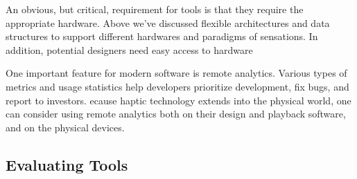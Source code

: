 An obvious, but critical, requirement for \haxd tools is that they require the appropriate hardware.
Above we've discussed flexible architectures and data structures to support different hardwares and paradigms of sensations.
In addition, potential designers need easy access to hardware


One important feature for modern software is remote analytics.
Various types of metrics and usage statistics help developers prioritize development, fix bugs, and report to investors.
ecause haptic technology extends into the physical world, one can consider using remote analytics both on their design and playback software, and on the physical devices.



%
%
\subsection{Evaluating \haxd Tools}






